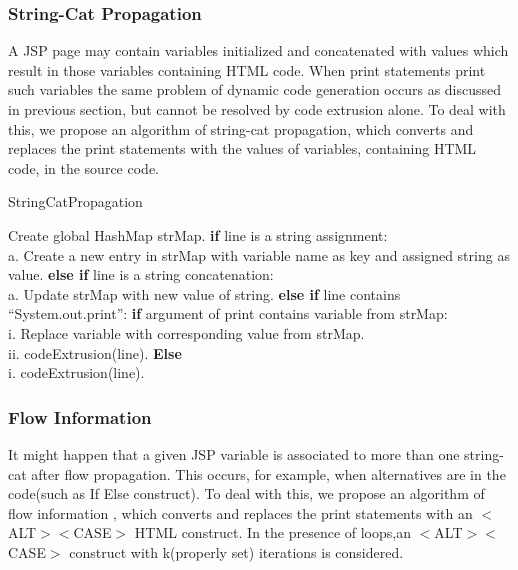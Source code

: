 \documentclass[11pt]{article}   %
\begin{document}
\subsubsection{String-Cat Propagation}
A JSP page may contain variables initialized and concatenated with values which result in those variables containing HTML code. When print statements print such variables the same problem of dynamic code generation occurs as discussed in previous section, but cannot be resolved by code extrusion alone.
To deal with this, we propose an algorithm of string-cat propagation, which converts and replaces the print statements with the values of variables, containing HTML code, in the source code.
\begin{algorithm}
\caption{StringCatPropagation}
\begin{algorithmic}[1]
\State Create global HashMap strMap.
\State \textbf{if} line is a string assignment:\\
\hspace{2cm}a. Create a new entry in strMap with variable name as key and assigned string as value.
\State \textbf{else if} line is a string concatenation:\\
\hspace{2cm}a. Update strMap with new value of string.
\State \textbf{else if} line contains “System.out.print”:
\State \hspace{2cm} \textbf{if} argument of print contains variable from strMap:\\
\hspace{4cm}i. Replace variable with corresponding value from strMap.\\
\hspace{4cm}ii. codeExtrusion(line).
\State \hspace{2cm} \textbf{Else}\\
\hspace{4cm}i.	codeExtrusion(line).

\end{algorithmic}
\end{algorithm}
\subsubsection{Flow Information}
It might happen that a given JSP variable is associated to more than one string-cat after flow propagation. This occurs, for example, when alternatives are in the code(such as If Else construct).
To deal with this, we propose an algorithm of flow information , which converts and replaces the print statements with an $<$ALT$><$CASE$>$ HTML construct.
In the presence of loops,an $<$ALT$><$CASE$>$ construct with k(properly set) iterations is considered.
\end{document}
